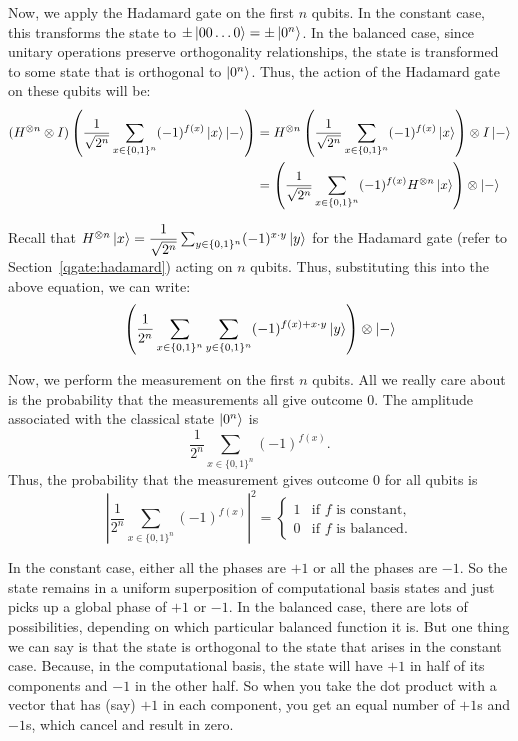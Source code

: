 Now, we apply the Hadamard gate on the first $n$ qubits. In the constant case, this transforms the state to $\pm \ket{00\ldots 0} = \pm \ket{0^n}$. In the balanced case, since unitary operations preserve orthogonality relationships, the state is transformed to some state that is orthogonal to $\ket{0^n}$. Thus, the action of the Hadamard gate on these qubits will be:
\begin{align*}
    (H^{\otimes n}\otimes I)\left(\frac{1}{\sqrt{2^n}}\sum_{x \in \{0,1\}^n}(-1)^{f(x)}\ket{x}\ket{-}\right)
    &=H^{\otimes n}\left(\frac{1}{\sqrt{2^n}}\sum_{x \in \{0,1\}^n}(-1)^{f(x)}\ket{x}\right) \otimes I\ket{-}\\
    &=\left(\frac{1}{\sqrt{2^n}}\sum_{x \in \{0,1\}^n}(-1)^{f(x)}H^{\otimes n}\ket{x}\right) \otimes \ket{-}
\end{align*}

Recall that $H^{\otimes n}\ket{x}=\dfrac{1}{\sqrt{2^n}}\sum_{y \in \{0,1\}^n}(-1)^{x\cdot y}\ket{y}$ for the Hadamard gate (refer to Section~\ref{qgate:hadamard}) acting on $n$ qubits. Thus, substituting this into the above equation, we can write:
\[
    \left(\frac{1}{2^n}\sum_{x \in \{0,1\}^n}\sum_{y \in \{0,1\}^n}(-1)^{f(x)+x\cdot y}\ket{y}\right) \otimes \ket{-}
\]

Now, we perform the measurement on the first $n$ qubits. All we really care about is the probability that the measurements all give outcome $0$. The amplitude associated with the classical state $\ket{0^n}$ is
\[
\dfrac{1}{2^n}\sum_{x\in\{0,1\}^n} (-1)^{f(x)}.
\]
Thus, the probability that the measurement gives outcome $0$ for all qubits is
\[
\left|\dfrac{1}{2^n} \sum_{x\in\{0,1\}^n}
(-1)^{f(x)}\right|^2 = 
\begin{cases} 
1 & \text{if $f$ is constant}, \\
0 & \text{if $f$ is balanced}.
\end{cases}
\]



In the constant case, either all the phases are $+1$ or all the phases are $-1$. So the state remains in a uniform superposition of computational basis states and just picks up a global phase of $+1$ or $-1$. In the balanced case, there are lots of possibilities, depending on which particular balanced function it is. But one thing we can say is that the state is orthogonal to the state that arises in the constant case. Because, in the computational basis, the state will have $+1$ in half of its components and $-1$ in the other half. So when you take the dot product with a vector that has (say) $+1$ in each component, you get an equal number of $+1$s and $-1$s, which cancel and result in zero.

